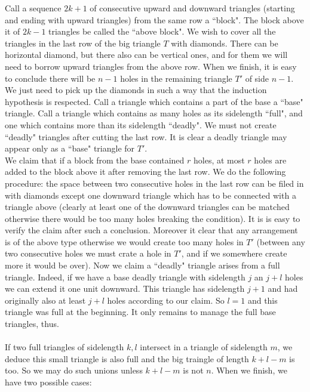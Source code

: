 Call a sequence $ 2k+1$ of consecutive upward and downward triangles (starting and ending with upward triangles) from the same row a ``block". The block above it of $ 2k-1$ triangles be called the ``above block". We wish to cover all the triangles in the last row of the big triangle $ T$ with diamonds. There can be horizontal diamond, but there also can be vertical ones, and for them we will need to borrow upward triangles from the above row. When we finish, it is easy to conclude there will be $ n-1$ holes in the remaining triangle $ T'$ of side $ n-1$. We just need to pick up the diamonds in such a way that the induction hypothesis is respected. Call a triangle which contains a part of the base a ``base" triangle. Call a triangle which contains as many holes as its sidelength ``full", and one which contains more than its sidelength ``deadly". We must not create ``deadly" triangles after cutting the last row. It is clear a deadly triangle may appear only as a ``base" triangle for $ T'$. \\
We claim that if a block from the base contained $ r$ holes, at most $ r$ holes are added to the block above it after removing the last row. We do the following procedure: the space between two consecutive holes in the last row can be filed in with diamonds except one downward triangle which has to be connected with a triangle above (clearly at least one of the downward triangles can be matched otherwise there would be too many holes breaking the condition). It is is easy to verify the claim after such a conclusion. Moreover it clear that any arrangement is of the above type otherwise we would create too many holes in $ T'$ (between any two consecutive holes we must crate a hole in $ T'$, and if we somewhere create more it would be over). Now we claim a ``deadly" triangle arises from a full triangle. Indeed, if we have a base deadly triangle with sidelength $ j$ an $ j+l$ holes we can extend it one unit downward. This triangle has sidelength $ j+1$ and had originally also at least $ j+l$ holes according to our claim. So $ l=1$ and this triangle was full at the beginning. It only remains to manage the full base triangles, thus. \\\\
If two full triangles of sidelength $ k,l$ intersect in a triangle of sidelength $ m$, we deduce this small triangle is also full and the big traingle of length $ k+l-m$ is too. So we may do such unions unless $ k+l-m$ is not $ n$. When we finish, we have two possible cases:
